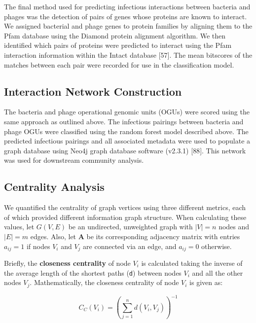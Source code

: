 \documentclass[12pt,]{article}
\begin{document}
The final method used for predicting infectious interactions between
bacteria and phages was the detection of pairs of genes whose proteins
are known to interact. We assigned bacterial and phage genes to protein
families by aligning them to the Pfam database using the Diamond protein
alignment algorithm. We then identified which pairs of proteins were
predicted to interact using the Pfam interaction information within the
Intact database {[}57{]}. The mean bitscores of the matches between each
pair were recorded for use in the classification model.

\subsection{Interaction Network
Construction}\label{interaction-network-construction}

The bacteria and phage operational genomic units (OGUs) were scored
using the same approach as outlined above. The infectious pairings
between bacteria and phage OGUs were classified using the random forest
model described above. The predicted infectious pairings and all
associated metadata were used to populate a graph database using Neo4j
graph database software (v2.3.1) {[}88{]}. This network was used for
downstream community analysis.

\subsection{Centrality Analysis}\label{centrality-analysis}

We quantified the centrality of graph vertices using three different
metrics, each of which provided different information graph structure.
When calculating these values, let \(G(V,E)\) be an undirected,
unweighted graph with \(|V|=n\) nodes and \(|E|=m\) edges. Also, let
\(\mathbf{A}\) be its corresponding adjacency matrix with entries
\(a_{ij} = 1\) if nodes \(V_i\) and \(V_j\) are connected via an edge,
and \(a_{ij} = 0\) otherwise.

Briefly, the \textbf{closeness centrality} of node \(V_i\) is calculated
taking the inverse of the average length of the shortest paths
(\texttt{d}) between nodes \(V_i\) and all the other nodes \(V_j\).
Mathematically, the closeness centrality of node \(V_i\) is given as:

\[ { C }_{ C }\left( { V }_{ i } \right) ={ \left( \sum _{ j=1 }^{ n }{ d\left( { V }_{ i },{ V }_{ j } \right)  }  \right)  }^{ -1 } \]
\end{document}
